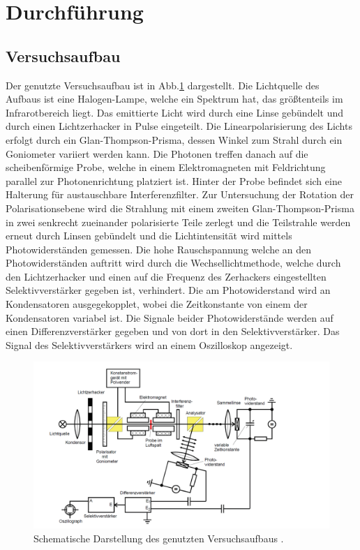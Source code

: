 \section{Durchführung}\label{durchfuehrung}
\subsection{Versuchsaufbau}
Der genutzte Versuchsaufbau ist in Abb.\ref{Aufbau} dargestellt. Die Lichtquelle des Aufbaus ist eine Halogen-Lampe, welche ein Spektrum hat, das größtenteils im Infrarotbereich liegt. Das emittierte Licht wird durch eine Linse gebündelt und durch einen Lichtzerhacker in Pulse eingeteilt.
Die Linearpolarisierung des Lichts erfolgt durch ein Glan-Thompson-Prisma, dessen Winkel zum Strahl durch ein Goniometer variiert werden kann. Die Photonen treffen danach auf die scheibenförmige Probe, welche in einem Elektromagneten mit Feldrichtung parallel zur Photonenrichtung platziert ist. Hinter der Probe befindet sich eine Halterung für austauschbare Interferenzfilter. Zur Untersuchung der Rotation der Polarisationsebene wird die Strahlung mit einem zweiten Glan-Thompson-Prisma in zwei senkrecht zueinander polarisierte Teile  zerlegt und die Teilstrahle werden erneut durch Linsen gebündelt und die Lichtintensität wird mittels Photowiderständen gemessen. Die hohe Rauschspannung welche an den Photowiderständen auftritt wird durch die Wechsellichtmethode, welche durch den Lichtzerhacker und einen auf die Frequenz des Zerhackers eingestellten Selektivverstärker gegeben ist, verhindert. Die am Photowiderstand wird an Kondensatoren ausgegekopplet, wobei die Zeitkonstante von einem der Kondensatoren variabel ist. Die Signale beider Photowiderstände werden auf einen Differenzverstärker gegeben und von dort in den Selektivverstärker. Das Signal des Selektivverstärkers wird an einem Oszilloskop angezeigt.
\begin{figure}[H]
  \centering
  \includegraphics[width=1\textwidth]{bilder/aufbau.png}
  \caption{Schematische Darstellung des genutzten Versuchsaufbaus \cite{anleitung}.}
  \label{Aufbau}
\end{figure}
